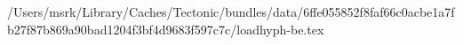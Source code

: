 /Users/msrk/Library/Caches/Tectonic/bundles/data/6ffe055852f8faf66c0acbe1a7fb27f87b869a90bad1204f3bf4d9683f597c7c/loadhyph-be.tex